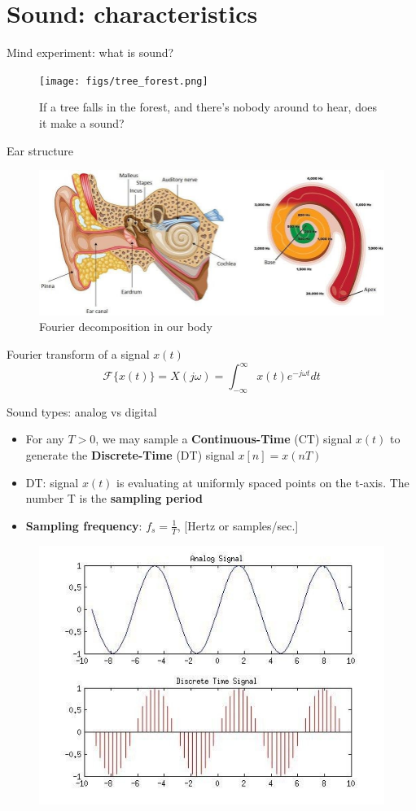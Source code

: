 \section{Sound: characteristics}
\begin{frame}{Mind experiment: what is sound?}
		\begin{figure}
			\centering
			\texttt{[image: figs/tree\_forest.png]}
			\caption{If a tree falls in the forest, and there’s nobody around to hear, does it make a sound?}
		\end{figure}
\end{frame}
\begin{frame}{Ear structure}
	\begin{figure}
		\centering
		\includegraphics[width=0.99\linewidth]{figs/ear_structure.png}
		\caption{Fourier decomposition in our body}
	\end{figure}
	Fourier transform of a signal $x(t)$
	$$
	\mathcal{F}\{x(t)\}=X(j \omega)=\int_{-\infty}^{\infty} x(t) e^{-j \omega t} d t
	$$
\end{frame}
\begin{frame}{Sound types: analog vs digital}
		\begin{itemize}
			\item For any $T > 0$, we may sample a \textbf{Continuous-Time} (CT) signal $x(t)$ to generate the \textbf{Discrete-Time} (DT) signal $x[n]=x(nT)$
			\item DT: signal $x(t)$ is evaluating at uniformly spaced points on the t-axis. The number T is the \textbf{sampling period}
			\item \textbf{Sampling frequency}: $f_s=\frac{1}{T}$, {[Hertz or samples/sec.]}
		\end{itemize}
	\begin{figure}
		\centering
		\includegraphics[width=0.6\linewidth]{figs/analog_discrete.png}
	\end{figure}
\end{frame}
